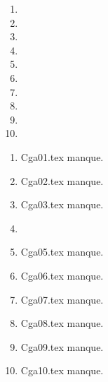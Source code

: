  
 
\begin{enumerate}
  \item  
  \item  
  \item  
  \item  
  \item  
  \item  
  \item  
  \item  
  \item  
  \item  
\end{enumerate} 
\clearpage 
{}
\begin{enumerate}
  \item Cga01.tex manque. 
  \item Cga02.tex manque. 
  \item Cga03.tex manque. 
  \item  
  \item Cga05.tex manque. 
  \item Cga06.tex manque. 
  \item Cga07.tex manque. 
  \item Cga08.tex manque. 
  \item Cga09.tex manque. 
  \item Cga10.tex manque. 
\end{enumerate} 
